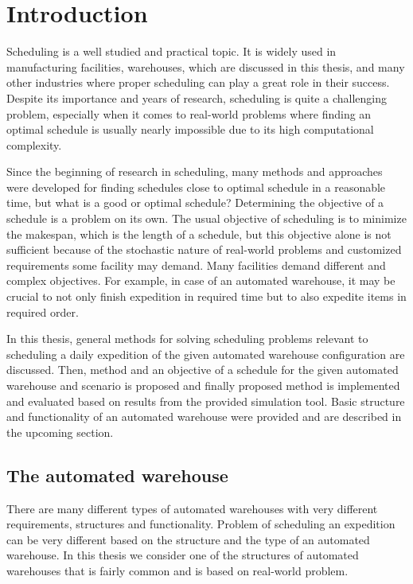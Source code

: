 \documentclass{ctuthesis}
\begin{document}
\maketitle

\chapter{Introduction}

Scheduling is a well studied and practical topic. It is widely used in manufacturing facilities, warehouses, which are discussed in this thesis, and many other industries where proper scheduling can play a great role in their success. Despite its importance and years of research, scheduling is quite a challenging problem, especially when it comes to real-world problems where finding an optimal schedule is usually nearly impossible due to its high computational complexity. 

Since the beginning of research in scheduling, many methods and approaches were developed for finding schedules close to optimal schedule in a reasonable time, but what is a good or optimal schedule? Determining the objective of a schedule is a problem on its own. The usual objective of scheduling is to minimize the makespan, which is the length of a schedule, but this objective alone is not sufficient because of the stochastic nature of real-world problems and customized requirements some facility may demand. Many facilities demand different and complex objectives. For example, in case of an automated warehouse, it may be crucial to not only finish expedition in required time but to also expedite items in required order. 

In this thesis, general methods for solving scheduling problems relevant to scheduling a daily expedition of the given automated warehouse configuration are discussed. Then, method and an objective of a schedule for the given automated warehouse and scenario is proposed and finally proposed method is implemented and evaluated based on results from the provided simulation tool. Basic structure and functionality of an automated warehouse were provided and are described in the upcoming section.

\section{The automated warehouse}

There are many different types of automated warehouses with very different requirements, structures and functionality. Problem of scheduling an expedition can be very different based on the structure and the type of an automated warehouse. In this thesis we consider one of the structures of automated warehouses that is fairly common and is based on real-world problem. 
\end{document}
